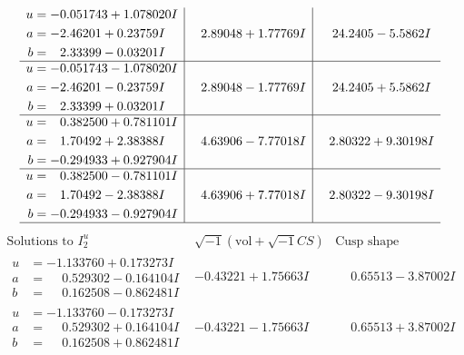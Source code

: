 \documentclass[1p]{elsarticle_modified}
\theoremstyle{definition}
\newcommand{\I}{\sqrt{-1}}
\begin{document}
$$\begin{array}{c|c|c}
\begin{aligned}
u &= -0.051743 + 1.078020 I \\
a &= -2.46201 + 0.23759 I \\
b &= \phantom{-}2.33399 - 0.03201 I\end{aligned}
 & \phantom{-}2.89048 + 1.77769 I & \phantom{-}24.2405 - 5.5862 I \\ \hline\begin{aligned}
u &= -0.051743 - 1.078020 I \\
a &= -2.46201 - 0.23759 I \\
b &= \phantom{-}2.33399 + 0.03201 I\end{aligned}
 & \phantom{-}2.89048 - 1.77769 I & \phantom{-}24.2405 + 5.5862 I \\ \hline\begin{aligned}
u &= \phantom{-}0.382500 + 0.781101 I \\
a &= \phantom{-}1.70492 + 2.38388 I \\
b &= -0.294933 + 0.927904 I\end{aligned}
 & \phantom{-}4.63906 - 7.77018 I & \phantom{-}2.80322 + 9.30198 I \\ \hline\begin{aligned}
u &= \phantom{-}0.382500 - 0.781101 I \\
a &= \phantom{-}1.70492 - 2.38388 I \\
b &= -0.294933 - 0.927904 I\end{aligned}
 & \phantom{-}4.63906 + 7.77018 I & \phantom{-}2.80322 - 9.30198 I\\
 \hline 
 \end{array}$$\newpage$$\begin{array}{c|c|c}  
\text{Solutions to }I^u_{2}& \I (\text{vol} + \sqrt{-1}CS) & \text{Cusp shape}\\
 \hline 
\begin{aligned}
u &= -1.133760 + 0.173273 I \\
a &= \phantom{-}0.529302 - 0.164104 I \\
b &= \phantom{-}0.162508 - 0.862481 I\end{aligned}
 & -0.43221 + 1.75663 I & \phantom{-}0.65513 - 3.87002 I \\ \hline\begin{aligned}
u &= -1.133760 - 0.173273 I \\
a &= \phantom{-}0.529302 + 0.164104 I \\
b &= \phantom{-}0.162508 + 0.862481 I\end{aligned}
 & -0.43221 - 1.75663 I & \phantom{-}0.65513 + 3.87002 I \\ \hline\begin{aligned}

\end{aligned}
\end{array}$$
\end{document}
